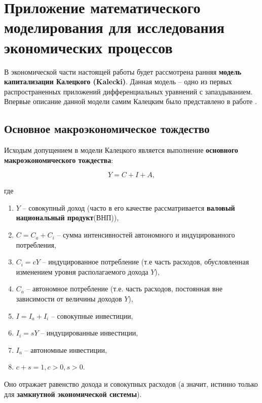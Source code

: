 \section{Приложение математического\\моделирования для исследования\\экономических процессов}

В экономической части настоящей работы будет рассмотрена ранняя \textbf{модель капитализации Калецкого (Kalecki)}. Данная модель \--- одно из первых распространенных приложений дифференциальных уравнений с запаздыванием. Впервые описание данной модели самим Калецким было представлено в работе \cite{bib:Kalecki}.

\subsection{Основное макроэкономическое тождество}

Исходым допущением в модели Калецкого является выполнение \textbf{основного макроэкономического тождества}:

\begin{equation}
Y = C + I + A,
\end{equation}

где

\begin{enumerate}
\item $Y$ \--- совокупный доход (часто в его качестве рассматривается \textbf{валовый национальный продукт}(ВНП)),
\item $C = C_a + C_i$ \--- сумма интенсивностей автономного и индуцированного потребления,
\item $C_i = c Y$ \--- индуцированное потребление (т.е часть расходов, обусловленная изменением уровня располагаемого дохода $Y$),
\item $C_a$ \--- автономное потребление (т.е. часть расходов, постоянная вне зависимости от величины доходов $Y$),
\item $I = I_a + I_i$ \--- совокупные инвестиции,
\item $I_i = s Y$ \--- индуцированные инвестиции,
\item $I_a$ \--- автономные инвестиции,
\item $c+s=1, c>0, s>0$.
\end{enumerate}

Оно отражает равенство дохода и совокупных расходов (а значит, истинно только для \textbf{замкнутной экономической системы}).

